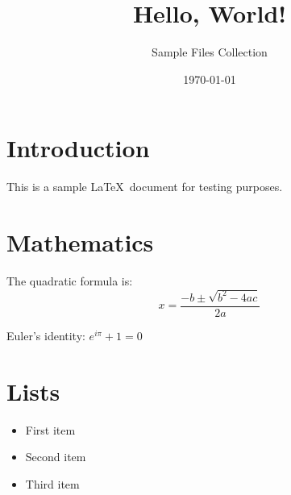 \documentclass[12pt]{article}
\title{Hello, World!}
\author{Sample Files Collection}
\date{\today}
\begin{document}
\maketitle

\section{Introduction}
This is a sample \LaTeX\ document for testing purposes.

\section{Mathematics}
The quadratic formula is:
\begin{equation}
    x = \frac{-b \pm \sqrt{b^2 - 4ac}}{2a}
\end{equation}

Euler's identity: $e^{i\pi} + 1 = 0$

\section{Lists}
\begin{itemize}
    \item First item
    \item Second item
    \item Third item
\end{itemize}
\end{document}
